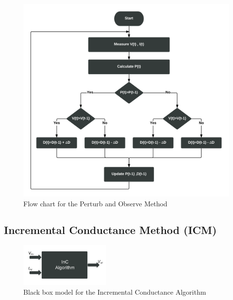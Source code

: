 {  \begin{figure}[H]
    \begin{center}
    \includegraphics[width=\textwidth]{images/pno_flow}
    \caption{ Flow chart for the Perturb and Observe Method }
    \label{fig:PnO_flow}
    \end{center}
    \end{figure}
  
  \subsection{Incremental Conductance Method (ICM) }
  
  \begin{figure}[H]
         \begin{center}
         \includegraphics[width=0.4\textwidth]{images/inC_block}
         \caption{ Black box model for the Incremental Conductance Algorithm }
         \label{fig:inC_block}
    \end{center}
  \end{figure}
  
}
